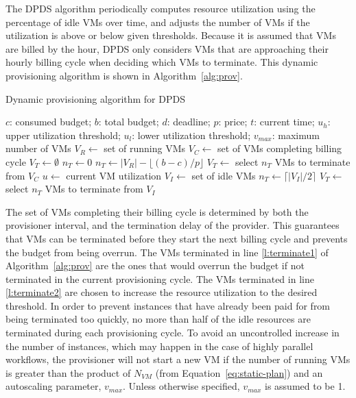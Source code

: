 \documentclass[conference]{IEEEtran}
\begin{document}
The DPDS algorithm periodically computes resource
utilization using the percentage of idle VMs over time, and adjusts the number
of VMs if the utilization is above or below given thresholds. Because it is
assumed that VMs are billed by the hour, DPDS only considers VMs that are
approaching their hourly billing cycle when deciding which VMs to terminate.
This dynamic provisioning algorithm is shown in Algorithm~\ref{alg:prov}.


\begin{algorithm}[tb]
\caption{Dynamic provisioning algorithm for DPDS}
\label{alg:prov}
{\footnotesize
\begin{algorithmic}[1]
\Require $c$: consumed budget; $b$: total budget; $d$: deadline; $p$: price;
$t$: current time; $u_h$: upper utilization threshold; $u_l$: lower utilization
threshold; $v_{max}$: maximum number of VMs
  \State $V_R\gets$ set of running VMs
    \State $V_C\gets$ set of VMs completing billing cycle
    \State $V_T\gets \emptyset$ 
    \State $n_T\gets 0$ 
      \State $n_T\gets |V_R| - \lfloor(b-c)/p\rfloor$
      \State $V_T\gets$ select $n_T$ VMs to terminate from $V_C$
      \State {} \label{l:terminate1}
    \Else 
    \State $u\gets$ current VM utilization
        \State {}
        \State $V_I\gets$ set of idle VMs
        \State $n_T\gets \lceil|V_I|/2\rceil$ \label{l:nT2}
      \State $V_T\gets$ select $n_T$ VMs to terminate from $V_I$
        \State {} \label{l:terminate2}
      \EndIf 
    \EndIf
\EndProcedure
\end{algorithmic}
}
\end{algorithm}

The set of VMs completing their billing cycle is determined by  both
the provisioner interval, and the termination delay of the provider. This
guarantees that VMs can be terminated before they start the next billing cycle
and prevents the budget from being overrun. The VMs terminated in line
\ref{l:terminate1} of Algorithm~\ref{alg:prov} are the ones that would overrun
the budget if not terminated in the current provisioning cycle. The VMs
terminated in line \ref{l:terminate2} are chosen to increase the resource
utilization to the desired threshold. In order to prevent instances that have
already been paid for from being terminated too quickly, no more than half of
the idle resources are terminated during each provisioning cycle. To avoid an
uncontrolled increase in the number of instances, which may happen in the case
of highly parallel workflows, the provisioner will not start a new VM if the
number of running VMs is greater than the product of $N_{VM}$ (from
Equation~\ref{eq:static-plan}) and an autoscaling parameter, $v_{max}$. Unless
otherwise specified, $v_{max}$ is assumed to be 1.
\end{document}
